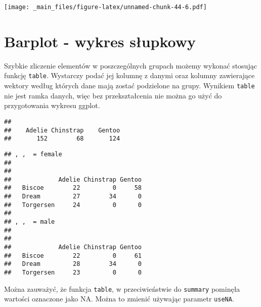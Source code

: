 \documentclass[
]{book}
\newenvironment{Shaded}{\begin{snugshade}}{\end{snugshade}}
\newcommand{\CommentTok}[1]{\textcolor[rgb]{0.56,0.35,0.01}{\textit{#1}}}
\newcommand{\FunctionTok}[1]{\textcolor[rgb]{0.00,0.00,0.00}{#1}}
\newcommand{\NormalTok}[1]{#1}
\newcommand{\SpecialCharTok}[1]{\textcolor[rgb]{0.00,0.00,0.00}{#1}}
\begin{document}
\texttt{[image: \_main\_files/figure-latex/unnamed-chunk-44-6.pdf]}

\hypertarget{barplot---wykres-sux142upkowy}{%
\section{Barplot - wykres słupkowy}\label{barplot---wykres-sux142upkowy}}

Szybkie zliczenie elementów w poszczególnych grupach możemy wykonać stosując funkcję \texttt{table}. Wystarczy podać jej kolumnę z danymi oraz kolumny zawierające wektory według których dane mają zostać podzielone na grupy. Wynikiem \texttt{table} nie jest ramka danych, więc bez przekształcenia nie można go użyć do przygotowania wykresu ggplot.

\begin{Shaded}
\end{Shaded}

\begin{verbatim}
## 
##    Adelie Chinstrap    Gentoo 
##       152        68       124
\end{verbatim}

\begin{Shaded}
\end{Shaded}

\begin{verbatim}
## , ,  = female
## 
##            
##             Adelie Chinstrap Gentoo
##   Biscoe        22         0     58
##   Dream         27        34      0
##   Torgersen     24         0      0
## 
## , ,  = male
## 
##            
##             Adelie Chinstrap Gentoo
##   Biscoe        22         0     61
##   Dream         28        34      0
##   Torgersen     23         0      0
\end{verbatim}

Można zauważyć, że funkcja \texttt{table}, w przeciwieństwie do \texttt{summary} pominęła wartości oznaczone jako NA. Można to zmienić używając parametr \texttt{useNA}.
\end{document}

